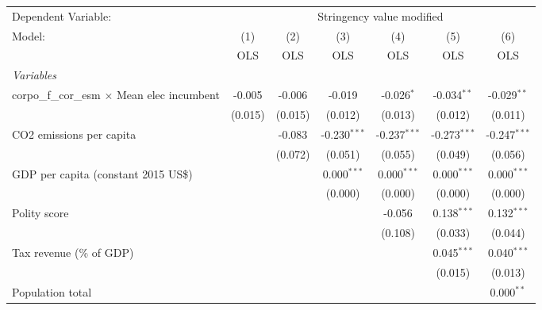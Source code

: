 
\begingroup
\centering
\begin{tabular}{lcccccc}
   \toprule
   Dependent Variable: & \multicolumn{6}{c}{Stringency value modified}\\
   Model:                                              & (1)     & (2)     & (3)            & (4)            & (5)            & (6)\\  
                                                       &  OLS    & OLS     & OLS            & OLS            & OLS            & OLS\\  
   \midrule
   \emph{Variables}\\
   corpo\_f\_cor\_esm $\times$ Mean elec incumbent     & -0.005  & -0.006  & -0.019         & -0.026$^{*}$   & -0.034$^{**}$  & -0.029$^{**}$\\   
                                                       & (0.015) & (0.015) & (0.012)        & (0.013)        & (0.012)        & (0.011)\\   
   CO2 emissions per capita                            &         & -0.083  & -0.230$^{***}$ & -0.237$^{***}$ & -0.273$^{***}$ & -0.247$^{***}$\\   
                                                       &         & (0.072) & (0.051)        & (0.055)        & (0.049)        & (0.056)\\   
   GDP per capita (constant 2015 US\$)                 &         &         & 0.000$^{***}$  & 0.000$^{***}$  & 0.000$^{***}$  & 0.000$^{***}$\\   
                                                       &         &         & (0.000)        & (0.000)        & (0.000)        & (0.000)\\   
   Polity score                                        &         &         &                & -0.056         & 0.138$^{***}$  & 0.132$^{***}$\\   
                                                       &         &         &                & (0.108)        & (0.033)        & (0.044)\\   
   Tax revenue (\% of GDP)                             &         &         &                &                & 0.045$^{***}$  & 0.040$^{***}$\\   
                                                       &         &         &                &                & (0.015)        & (0.013)\\   
   Population total                                    &         &         &                &                &                & 0.000$^{**}$\\   

\end{tabular}
